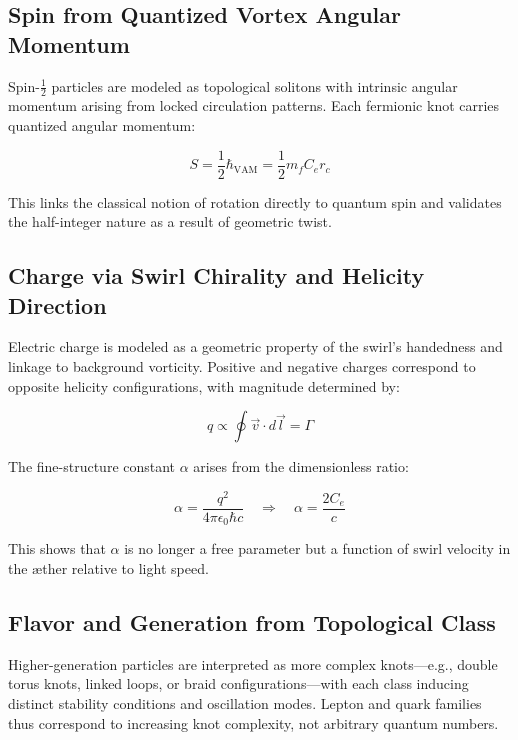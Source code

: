 \subsection{Spin from Quantized Vortex Angular Momentum}

Spin-$\tfrac{1}{2}$ particles are modeled as topological solitons with intrinsic angular momentum arising from locked circulation patterns. Each fermionic knot carries quantized angular momentum:

\begin{equation}
S = \frac{1}{2} \hbar_\text{VAM} = \frac{1}{2} m_f C_e r_c
\end{equation}

This links the classical notion of rotation directly to quantum spin and validates the half-integer nature as a result of geometric twist.

\subsection{Charge via Swirl Chirality and Helicity Direction}

Electric charge is modeled as a geometric property of the swirl’s handedness and linkage to background vorticity. Positive and negative charges correspond to opposite helicity configurations, with magnitude determined by:

\begin{equation}
q \propto \oint \vec{v} \cdot d\vec{l} = \Gamma
\end{equation}

The fine-structure constant $\alpha$ arises from the dimensionless ratio:

\begin{equation}
\alpha = \frac{q^2}{4\pi \epsilon_0 \hbar c} \quad \Rightarrow \quad \alpha = \frac{2C_e}{c}
\end{equation}

This shows that $\alpha$ is no longer a free parameter but a function of swirl velocity in the æther relative to light speed.

\subsection{Flavor and Generation from Topological Class}

Higher-generation particles are interpreted as more complex knots---e.g., double torus knots, linked loops, or braid configurations---with each class inducing distinct stability conditions and oscillation modes. Lepton and quark families thus correspond to increasing knot complexity, not arbitrary quantum numbers.

